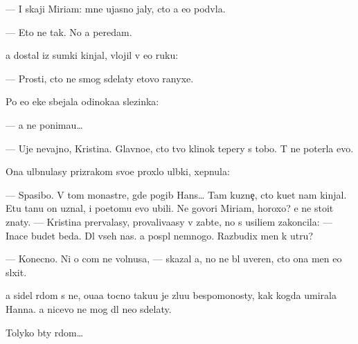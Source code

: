 \documentclass[10pt]{book}
\begin{document}
— I skaji Miriam: mne ujasno jaly, cto {\y}a {\y}e{\y}o podv{\e}la.

— Eto ne tak. No {\y}a peredam.

{\Y}a dostal iz sumki kinjal, vlojil v {\y}e{\y}o ruku:

— Prosti, cto ne smog sdelaty etovo ranyxe.

Po {\y}e{\y}o {\x}eke sbejala odinoka{\y}a slezinka:

— {\Y}a ne ponima{\y}u…

— Uje nevajno, Kristina. Glavno{\y}e, cto tvo{\y} klinok tepery s tobo{\y}. T{\yi} ne poter{\ia}la {\y}evo.

Ona ul{\yi}bnulasy prizrakom svo{\y}e{\y} proxlo{\y} ul{\yi}bki, xepnula:

— Spasibo. V tom monast{\yi}re, gde pogib Hans… Tam kuzne{\c}, cto ku{\y}et nam kinjal{\yi}. Etu ta{\y}nu on uznal, i poetomu {\y}evo ubili. Ne govori Miriam, horoxo? {\Y}e{\y} ne sto{\y}it znaty. — Kristina prervalasy, provaliva{\y}asy v zab{\yi}t{\y}e, no s usili{\y}em zakoncila: — Inace budet beda. Dl{\ia} vseh nas. {\Y}a pospl{\iu} nemnogo. Razbudix men{\ia} k utru?

— Konecno. Ni o com ne volnu{\y}sa, — skazal {\y}a, no ne b{\yi}l uveren, cto ona men{\ia} {\y}e{\x}o sl{\yi}xit.

{\Y}a sidel r{\ia}dom s ne{\y}, o{\x}u{\x}a{\y}a tocno taku{\y}u je zlu{\y}u bespomo{\x}nosty, kak kogda umirala Hanna. {\Y}a nicevo ne mog dl{\ia} ne{\y}o sdelaty.

Tolyko b{\yi}ty r{\ia}dom…
\end{document}

